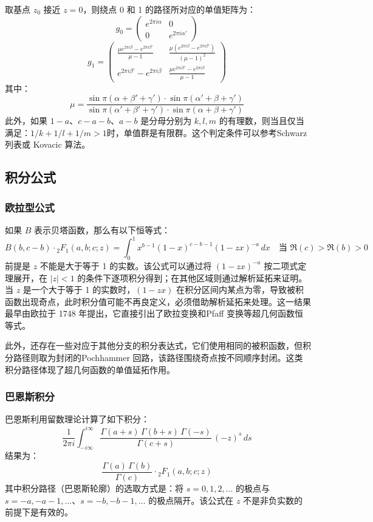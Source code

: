 取基点 $z_0$ 接近 $z = 0$，则绕点 0 和 1 的路径所对应的单值矩阵为：
$$
g_0 =
\begin{pmatrix}
e^{2\pi i \alpha} & 0 \\
0 & e^{2\pi i \alpha'}
\end{pmatrix}~
$$
$$
g_1 =
\begin{pmatrix}
\frac{\mu e^{2\pi i \beta} - e^{2\pi i \beta'}}{\mu - 1}
&
\frac{\mu (e^{2\pi i \beta} - e^{2\pi i \beta'})}{(\mu - 1)^2}
\\[6pt]
e^{2\pi i \beta'} - e^{2\pi i \beta}
&
\frac{\mu e^{2\pi i \beta'} - e^{2\pi i \beta}}{\mu - 1}
\end{pmatrix}~
$$
其中：
$$
\mu = \frac{
\sin \pi(\alpha + \beta' + \gamma') \cdot \sin \pi(\alpha' + \beta + \gamma')
}{
\sin \pi(\alpha' + \beta' + \gamma') \cdot \sin \pi(\alpha + \beta + \gamma')
}~
$$
此外，如果 $1 - a$、$c - a - b$、$a - b$ 是分母分别为 $k, l, m$ 的有理数，则当且仅当满足：$1/k + 1/l + 1/m> 1$时，单值群是有限群。这个判定条件可以参考Schwarz 列表或 Kovacic 算法。
\subsection{积分公式}
\subsubsection{欧拉型公式}
如果 $B$ 表示贝塔函数，那么有以下恒等式：
$$
B(b, c - b) \cdot {}_2F_1(a, b; c; z) = \int_0^1 x^{b - 1}(1 - x)^{c - b - 1}(1 - zx)^{-a} \, dx \quad \text{当 } \Re(c) > \Re(b) > 0~
$$
前提是 $z$ 不能是大于等于 1 的实数。该公式可以通过将 $(1 - zx)^{-a}$ 按二项式定理展开，在 $|z| < 1$ 的条件下逐项积分得到；在其他区域则通过解析延拓来证明。当 $z$ 是一个大于等于 1 的实数时，$(1 - zx)$ 在积分区间内某点为零，导致被积函数出现奇点，此时积分值可能不再良定义，必须借助解析延拓来处理。这一结果最早由欧拉于 1748 年提出，它直接引出了欧拉变换和Pfaff 变换等超几何函数恒等式。

此外，还存在一些对应于其他分支的积分表达式，它们使用相同的被积函数，但积分路径则取为封闭的Pochhammer 回路，该路径围绕奇点按不同顺序封闭。这类积分路径体现了超几何函数的单值延拓作用。
\subsubsection{巴恩斯积分}
巴恩斯利用留数理论计算了如下积分：
$$
\frac{1}{2\pi i} \int_{-i\infty}^{i\infty} \frac{\Gamma(a + s)\, \Gamma(b + s)\, \Gamma(-s)}{\Gamma(c + s)}\, (-z)^s \, ds~
$$
结果为：
$$
\frac{\Gamma(a)\, \Gamma(b)}{\Gamma(c)} \cdot {}_2F_1(a, b; c; z)~
$$
其中积分路径（巴恩斯轮廓）的选取方式是：将 $s = 0, 1, 2, \dots$ 的极点与 $s = -a, -a - 1, \dots$、$s = -b, -b - 1, \dots$ 的极点隔开。该公式在 $z$ 不是非负实数的前提下是有效的。
